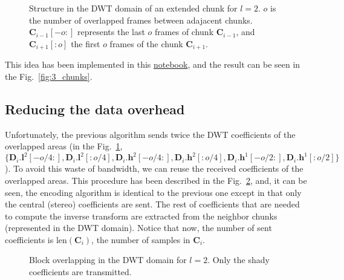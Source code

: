 
\begin{figure}
  \centering
  \caption{Structure in the DWT domain of an extended chunk for
    $l=2$. $o$ is the number of overlapped frames between adajacent
    chunks. ${\mathbf C}_{i-1}[-o:]$ represents the last $o$ frames of
    chunk ${\mathbf C}_{i-1}$, and ${\mathbf C}_{i+1}[:o]$ the first
    $o$ frames of the chunk ${\mathbf C}_{i+1}$.}
  \label{fig:subbands}
\end{figure}

This idea has been implemented in this
\href{https://github.com/Tecnologias-multimedia/intercom/blob/master/docs/overlapped_DWT_I.ipynb}{notebook},
and the result can be seen in the Fig.~\ref{fig:3_chunks}.

\subsection{Reducing the data overhead}

Unfortunately, the previous algorithm sends twice the DWT coefficients
of the overlapped areas (in the Fig.~\ref{fig:subbands}, $\{{\mathbf
  D}_i.{\mathbf l}^2[-o/4:], {\mathbf D}_i.{\mathbf l}^2[:o/4],
{\mathbf D}_i.{\mathbf h}^2[-o/4:], {\mathbf D}_i.{\mathbf
  h}^2[:o/4], {\mathbf D}_i.{\mathbf h}^1[-o/2:], {\mathbf
  D}_i.{\mathbf h}^1[:o/2]\}$). To avoid this waste of bandwidth, we
can reuse the received coefficients of the overlapped areas. This
procedure has been described in the Fig.~\ref{fig:overlapping}, and,
it can be seen, the encoding algorithm is identical to the previous
one except in that only the central (stereo) coefficients are
sent. The rest of coefficients that are needed to compute the inverse
transform are extracted from the neighbor chunks (represented in the
DWT domain). Notice that now, the number of sent coefficients is
$\text{len}({\mathbf C}_i)$, the number of samples in ${\mathbf C}_i$.

\begin{figure}
  \centering
  \caption{Block overlapping in the DWT domain for $l=2$. Only the
    shady coefficients are transmitted.}
  \label{fig:overlapping}
\end{figure}

